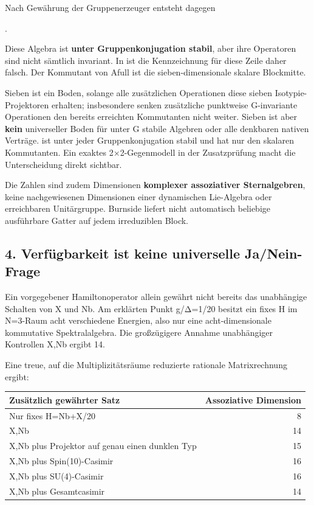 Nach Gewährung der Gruppenerzeuger entsteht dagegen

.

Diese Algebra ist \textbf{unter Gruppenkonjugation stabil}, aber ihre
Operatoren sind nicht sämtlich invariant. In
 ist die Kennzeichnung
 für diese Zeile daher falsch. Der
Kommutant von Afull ist die sieben-dimensionale skalare Blockmitte.

Sieben ist ein Boden, solange alle zusätzlichen Operationen diese sieben
Isotypie-Projektoren erhalten; insbesondere senken zusätzliche
punktweise G-invariante Operationen den bereits erreichten Kommutanten
nicht weiter. Sieben ist aber \textbf{kein} universeller Boden für unter
G stabile Algebren oder alle denkbaren nativen Verträge.
 ist unter jeder Gruppenkonjugation stabil und hat nur
den skalaren Kommutanten. Ein exaktes 2×2-Gegenmodell in der
Zusatzprüfung macht die Unterscheidung direkt sichtbar.

Die Zahlen sind zudem Dimensionen \textbf{komplexer assoziativer
Sternalgebren}, keine nachgewiesenen Dimensionen einer dynamischen
Lie-Algebra oder erreichbaren Unitärgruppe. Burnside liefert nicht
automatisch beliebige ausführbare Gatter auf jedem irreduziblen Block.

\subsection{4. Verfügbarkeit ist keine universelle
Ja/Nein-Frage}\label{verfuxfcgbarkeit-ist-keine-universelle-janein-frage}

Ein vorgegebener Hamiltonoperator allein gewährt nicht bereits das
unabhängige Schalten von X und Nb. Am erklärten Punkt g/Δ=1/20 besitzt
ein fixes H im N=3-Raum acht verschiedene Energien, also nur eine
acht-dimensionale kommutative Spektralalgebra. Die großzügigere Annahme
unabhängiger Kontrollen X,Nb ergibt 14.

Eine treue, auf die Multiplizitätsräume reduzierte rationale
Matrixrechnung ergibt:

{\def\LTcaptype{none} %
\begin{longtable}[]{@{}lr@{}}
\toprule\noalign{}
Zusätzlich gewährter Satz & Assoziative Dimension \\
\midrule\noalign{}
\endhead
\bottomrule\noalign{}
\endlastfoot
Nur fixes H=Nb+X/20 & 8 \\
X,Nb & 14 \\
X,Nb plus Projektor auf genau einen dunklen Typ & 15 \\
X,Nb plus Spin(10)-Casimir & 16 \\
X,Nb plus SU(4)-Casimir & 16 \\
X,Nb plus Gesamtcasimir & 14 \\
\end{longtable}
}

